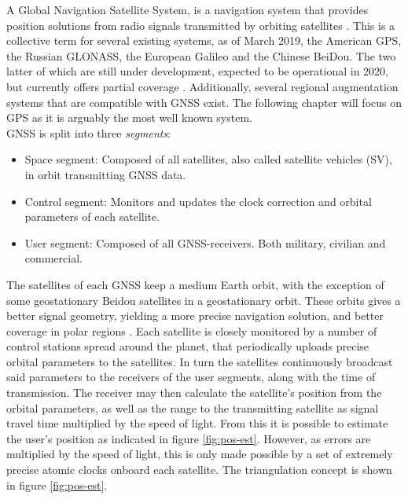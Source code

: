 
A Global Navigation Satellite System, is a navigation system that provides position solutions from radio signals transmitted by orbiting satellites \cite{groves2013principles}. This is a collective term for several existing systems, as of March 2019, the American GPS, the Russian GLONASS, the European Galileo and the Chinese BeiDou. The two latter of which are still under development, expected to be operational in 2020, but currently offers partial coverage \cite{galOper, beidouGlob}. Additionally, several regional augmentation systems that are compatible with GNSS exist. The following chapter will focus on GPS as it is arguably the most well known system. \\

GNSS is split into three \textit{segments}:

\begin{itemize}
\item Space segment: Composed of all satellites, also called satellite vehicles (SV), in orbit transmitting GNSS data.
\item Control segment: Monitors and updates the clock correction and orbital parameters of each satellite.
\item User segment: Composed of all GNSS-receivers. Both military, civilian and commercial.
\end{itemize}

The satellites of each GNSS keep a medium Earth orbit, with the exception of some geostationary Beidou satellites in a geostationary orbit. These orbits gives a better signal geometry, yielding a more precise navigation solution, and better coverage in polar regions \cite{groves2013principles}. Each satellite is closely monitored by a number of control stations spread around the planet, that periodically uploads precise orbital parameters to the satellites. In turn the satellites continuously broadcast said parameters to the receivers of the user segments, along with the time of transmission. The receiver may then calculate the satellite's position from the orbital parameters, as well as the range to the transmitting satellite as signal travel time multiplied by the speed of light. From this it is possible to estimate the user's position as indicated in figure \ref{fig:pos-est}. However, as errors are multiplied by the speed of light, this is only made possible by a set of extremely precise atomic clocks onboard each satellite. The triangulation concept is shown in figure \ref{fig:pos-est}.

